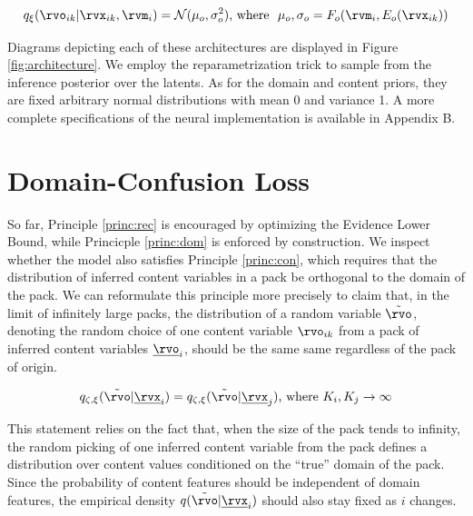 \documentclass{article} %
\begin{document}
\begin{equation}
q_\xi (\rvo_{ik} | \rvx_{ik}, \rvm_i) = \mathcal{N}(\mu_o, \sigma_o^2) \textrm{, where } ~ \mu_o, \sigma_o = F_o(\rvm_i, E_o(\rvx_{ik}))  
\end{equation}

Diagrams depicting each of these architectures are displayed in Figure \ref{fig:architecture}. We employ the reparametrization trick \citep{kingma2013auto} to sample from the inference posterior over the latents. As for the domain and content priors, they are fixed arbitrary normal distributions with mean 0 and variance 1. A more complete specifications of the neural implementation is available in Appendix B.

\section{Domain-Confusion Loss}



So far, Principle \ref{princ:rec} is encouraged by optimizing the Evidence Lower Bound, while Princicple \ref{princ:dom} is enforced by construction. We inspect whether the model also satisfies Principle \ref{princ:con}, which requires that the distribution of inferred content variables in a pack be orthogonal to the domain of the pack. We can reformulate this principle more precisely to claim that, in the limit of infinitely large packs, the distribution of a random variable $\tilde{\rvo}$, denoting the random choice of one content variable $\rvo_{ik}$ from a pack of inferred content variables $\underline{\rvo}_i$, should be the same same regardless of the pack of origin.

\begin{equation}
\label{eq:choose}
q_{\zeta, \xi}(\tilde{\rvo} | \underline{\rvx}_i) = q_{\zeta, \xi}(\tilde{\rvo} | \underline{\rvx}_j) \textrm{, where } K_i, K_j \to \infty
\end{equation}

This statement relies on the fact that, when the size of the pack tends to infinity, the random picking of one inferred content variable from the pack defines a distribution over content values conditioned on the ``true'' domain of the pack. Since the probability of content features should be independent of domain features, the empirical density $q(\tilde{\rvo} | \underline{\rvx}_i)$ should also stay fixed as $i$ changes.
\end{document}

